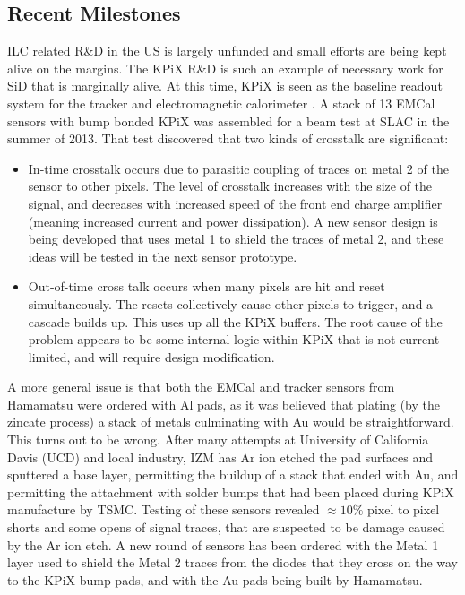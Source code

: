 \subsection{Recent Milestones}
ILC related R&D in the US is largely unfunded and small efforts are being kept alive on the margins. The KPiX R&D is such an example of necessary work for SiD that is marginally alive.
At this time, KPiX is seen as the baseline readout system for the tracker and electromagnetic calorimeter .  A stack of 13 EMCal sensors with bump bonded KPiX was assembled for a beam test at SLAC in the summer of 2013. That test discovered that two kinds of crosstalk are significant:
\begin{itemize}
	\item In-time crosstalk occurs due to parasitic coupling of traces on metal 2 of the sensor to other pixels. The level of crosstalk increases with the size of the signal, and decreases with increased speed of the front end charge amplifier (meaning increased current and power dissipation).  A new sensor design is being developed that uses metal 1 to shield the traces of metal 2, and these ideas will be tested in the next sensor prototype.
	\item Out-of-time cross talk occurs when many pixels are hit and reset simultaneously. The resets collectively cause other pixels to trigger, and a cascade builds up. This uses up all the KPiX buffers. The root cause of the problem appears to be some internal logic within KPiX that is not current limited, and will require design modification.
\end{itemize}
A more general issue is that both the EMCal and tracker sensors from Hamamatsu were ordered with Al pads, as it was believed that plating (by the zincate process) a stack of metals culminating with Au would be straightforward. This turns out to be wrong. After many attempts at University of California Davis (UCD) and local industry, IZM  has Ar ion etched the pad surfaces and sputtered a base layer, permitting the buildup of a stack that ended with Au, and permitting the attachment with solder bumps that had been placed during KPiX manufacture by TSMC. Testing of these sensors revealed $\approx 10\%$ pixel to pixel shorts and some opens of signal traces, that are suspected to be damage caused by the Ar ion etch. A new round of sensors has been ordered with the Metal 1 layer used to shield the Metal 2 traces from the diodes that they cross on the way to the KPiX bump pads, and with the Au pads being built by Hamamatsu.

